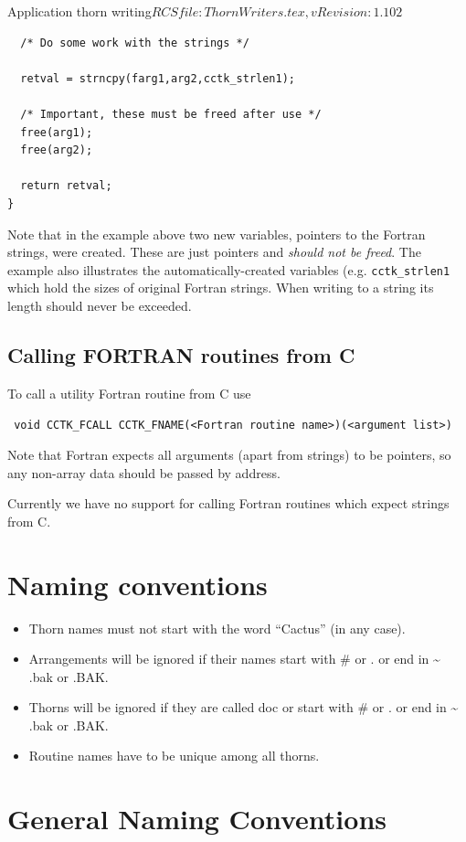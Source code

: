 \begin{cactuspart}{2}{Application thorn writing}{$RCSfile: ThornWriters.tex,v $}{$Revision: 1.102 $}
\begin{verbatim}
  /* Do some work with the strings */

  retval = strncpy(farg1,arg2,cctk_strlen1);

  /* Important, these must be freed after use */
  free(arg1);
  free(arg2);

  return retval;
}

\end{verbatim}

Note that in the example above two new variables, pointers to the
Fortran strings, were created.  These are just pointers and {\em
should not be freed}.  The example also illustrates the
automatically-created variables (e.g. {\tt cctk\_strlen1}
which hold the sizes of original Fortran strings.
When writing to a string its length should never be exceeded.

\subsection{Calling FORTRAN routines from C}
\label{sec:caforofr}

To call a utility Fortran routine from C use

{\tt
void CCTK\_FCALL CCTK\_FNAME(<Fortran routine name>)(<argument list>)
}

Note that Fortran expects all arguments (apart from strings) to be
pointers, so any non-array data should be passed by address.

Currently we have no support for calling Fortran routines which expect
strings from C.


\section{Naming conventions}

\begin{itemize}

\item{} Thorn names must not start with the word ``Cactus'' (in
        any case).
\item{} Arrangements will be ignored if their names start with \# or .
        or end in \~{} .bak or .BAK.
\item{} Thorns will be ignored if they are called doc or start with
        \# or . or end in \~{} .bak or .BAK.
\item{} Routine names have to be unique among all thorns.

\end{itemize}


\section{General Naming Conventions}


\end{cactuspart}
